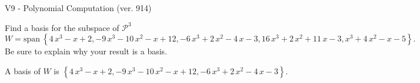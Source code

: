 \begin{exercise}
  \begin{exerciseTitle}V9 - Polynomial Computation (ver. 914)\end{exerciseTitle}
  \begin{exerciseStatement}
    Find a basis for the subspace of \(\mathcal{P}^3\) 
\[W=\mathrm{span}\ \left\{4 \, x^{3} - x + 2 , -9 \, x^{3} - 10 \, x^{2} - x + 12 , -6 \, x^{3} + 2 \, x^{2} - 4 \, x - 3 , 16 \, x^{3} + 2 \, x^{2} + 11 \, x - 3 , x^{3} + 4 \, x^{2} - x - 5\right\}.\]
 Be sure to explain why your result is a basis.


  \end{exerciseStatement}
  \begin{exerciseAnswer}
   A basis of \(W\) is  \(\left\{4 \, x^{3} - x + 2 , -9 \, x^{3} - 10 \, x^{2} - x + 12 , -6 \, x^{3} + 2 \, x^{2} - 4 \, x - 3\right\}\).
  


  \end{exerciseAnswer}
\end{exercise}